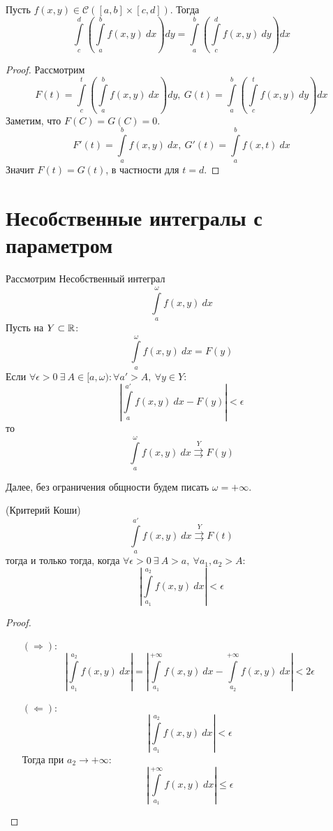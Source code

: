 \begin{theorem}
    Пусть $f(x,y)\in \mathcal{C}([a,b]\times [c,d])$. Тогда 
    \[\int\limits_{c}^{d}\left(\int\limits_{a}^{b}f(x,y)\ dx\right) dy=\int\limits_{a}^{b}\left(\int\limits_{c}^{d}f(x,y)\ dy\right) dx\]
\end{theorem}
\begin{proof}
    Рассмотрим
    \[F(t)=\int\limits_{c}^{t}\left(\int\limits_{a}^{b}f(x,y)\ dx\right) dy,\ G(t)=\int\limits_{a}^{b}\left(\int\limits_{c}^{t}f(x,y)\ dy\right)dx\]
    Заметим, что $F(C)=G(C)=0$.
    \[F'(t)=\int\limits_{a}^{b}f(x,y)\ dx,\ G'(t)=\int\limits_{a}^{b}f(x,t)\ dx\]
    Значит $F(t)=G(t)$, в частности для $t=d$.
\end{proof}
\section{Несобственные интегралы с параметром}
\begin{definition}
    Рассмотрим Несобственный интеграл 
    \[\int\limits_{a}^{\omega}f(x,y)\ dx\]
    Пусть на $Y\subset \mathbb{R}$:
    \[\int\limits_{a}^{\omega}f(x,y)\ dx=F(y)\]
    Если $\forall \epsilon>0\ \exists\ A\in [a,\omega): \forall a'>A,\ \forall y\in Y:$
    \[\left|\int\limits_{a}^{a'}f(x,y)\ dx-F(y)\right|<\epsilon\]
    то
    \[\int\limits_{a}^{\omega}f(x,y)\ dx\overset{Y}{\rightrightarrows} F(y)\]
\end{definition}
Далее, без ограничения общности будем писать $\omega=+\infty$.
\begin{theorem} (Критерий Коши)\\
    \[\int\limits_{a}^{a'}f(x,y)\ dx\overset{Y}{\rightrightarrows} F(t)\]
    тогда и только тогда, когда $\forall \epsilon>0\ \exists\ A>a,\ \forall a_1,a_2>A$:
    \[\left|\int\limits_{a_1}^{a_2}f(x,y)\ dx\right|<\epsilon\]
\end{theorem}
\begin{proof}\tab
    \begin{itemize}
        \item[$(\Rightarrow)$:]
        \[\left|\int\limits_{a_1}^{a_2}f(x,y)\ dx\right|=\left|\int\limits_{a_1}^{+\infty}f(x,y)\ dx-\int\limits_{a_2}^{+\infty}f(x,y)\ dx\right|< 2\epsilon\]
        \item[$(\Leftarrow)$:]
        \[\left|\int\limits_{a_1}^{a_2}f(x,y)\ dx\right|<\epsilon\]
        Тогда при $a_2\to +\infty$:
        \[\left|\int\limits_{a_1}^{+\infty}f(x,y)\ dx\right|\leq \epsilon\]
    \end{itemize}
\end{proof}

